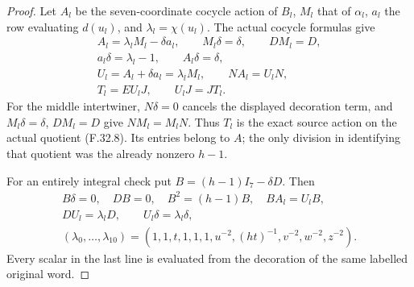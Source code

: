 \begin{proof}
Let $A_l$ be the seven-coordinate
cocycle action of $B_l$, $M_l$ that
of $\alpha_l$, $a_l$ the row evaluating
$d(u_l)$, and $\lambda_l=\chi(u_l)$.
The actual cocycle formulas give
\[
 \begin{gathered}
 A_l=\lambda_lM_l-\delta a_l,\qquad
 M_l\delta=\delta,\qquad DM_l=D,\\
 a_l\delta=\lambda_l-1,\qquad A_l\delta=\delta,\\
 U_l=A_l+\delta a_l=\lambda_lM_l,
             \qquad NA_l=U_lN,\\
 T_l=EU_lJ,\qquad U_lJ=JT_l.
 \end{gathered}                                                \tag{F.32.9}
\]
For the middle intertwiner, $N\delta=0$
cancels the displayed decoration term,
and $M_l\delta=\delta$, $DM_l=D$
give $NM_l=M_lN$.
Thus $T_l$ is the exact source action
on the actual quotient (F.32.8).
Its entries belong to $A$; the only
division in identifying that quotient
was the already nonzero $h-1$.

For an entirely integral check put
$B=(h-1)I_7-\delta D$. Then
\[
 \begin{gathered}
 B\delta=0,\quad DB=0,\quad B^2=(h-1)B,\quad
 BA_l=U_lB,\\
 DU_l=\lambda_lD,\qquad U_l\delta=\lambda_l\delta,\\
 (\lambda_0,\ldots,\lambda_{10})=
 (1,1,t,1,1,1,u^{-2},(ht)^{-1},v^{-2},w^{-2},z^{-2}).
 \end{gathered}                                                \tag{F.32.10}
\]
Every scalar in the last line is
evaluated from the decoration of the
same labelled original word.


\end{proof}
